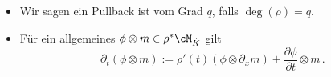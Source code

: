 \begin{bem}
\begin{itemize}
\item Wir sagen ein Pullback ist vom Grad $q$, falls $\deg(\rho)=q$.
\item Für ein allgemeines $\phi\otimes m\in \rho^{*}\cM_{\hat K}$ gilt
\begin{equation} \label{eq:pull-back-zusammenhang-2}
\partial_t(\phi\otimes m):=\rho'(t)(\phi\otimes\partial_xm) +
  \frac{\partial\phi}{\partial t}\otimes m \,.
\end{equation}
\end{itemize}
\end{bem}
\begin{comment}
Nun wollen wir uns noch genauer mit dem Pullback beschäftigen, und stellen uns
die Frage:
\paragraph{Wie sieht die Wirkung der Derivation auf dem Pullback Zusammenhang
aus?} Für $\rho(t)=t^p$ betrachten wir beispielsweise ein Element der Form
$f(x)m=f(\rho(t))m\in\rho^*\cM_{\hat K}$, dann gilt
\begin{align*}
\partial_x(f(x)m) &= \partial_{\rho(t)}(f(\rho(t))m) \\
  &= f'(\rho(t))\cdot \underset{=1}
  {\underbrace{\frac{\partial(f(t))}{\partial(f(t))}}}m +
  f(\rho(t))\underset{=\partial_x} {\underbrace{\partial_{\rho(t)}}}m
\\&= f'(\rho(t))m + f(\rho(t))\partial_x m
  = (\star)
\\ \rho'(t)^{-1}\partial_t(f(x)m) &= \frac{1}{pt^{p-1}}\partial_t(f(t^p)m)
\\ &= f'(t^p)m+f(t^p)\frac{1}{pt^{p-1}}\partial_t m = (\star) \\
\end{align*}
Also gilt $\partial_t(f(t)m) = \rho'(u)^{-1}\partial_u(f(t)m)$ und somit
lässt sich vermuten, dass die Wirkung von $\partial_x$ gleich der Wirkung von
$\rho'(t)^{-1}\partial_t$ ist. In der Tat stimmt diese Vermutung, wie das
folgende Lemma zeigt.
\end{comment}
\begin{comment}
Sei $f(x)m=f(\rho(t))m\in\rho^*\cM_{\hat K}$. Es gilt, dass
\begin{align*}
\partial_x(f(x)m) &= \partial_{\rho(t)}(f(\rho(t))m) \\
  &= f'(\rho(t))\cdot \underset{=1}
  {\underbrace{\frac{\partial(f(t))}{\partial(f(t))}}}m +
  f(\rho(t))\underset{=\partial_x} {\underbrace{\partial_{\rho(t)}}}m
\\&= f'(\rho(t))m + f(\rho(t))\partial_x m
\\&= f'(t^p)m+f(t^p)\frac{1}{pt^{p-1}}\partial_t m
\\&= \myubracket{\frac{1}{pt^{p-1}}}\partial_t(f(\myubracket{t^p})m)
\\&=\myobracket{\rho'(t)^{-1}}\partial_t(f(\myobracket{x})m) 
\end{align*}
und damit lässt sich vermuten, dass die Wirkung von $\partial_x$ genau die
Wirkung von $\rho'(t)^{-1}\partial_t$ ist. In der Tat ist dies, nach dem
folgenden Satz, wahr.
\end{comment}

